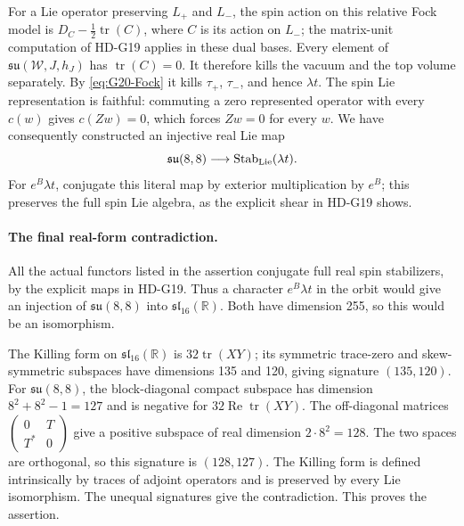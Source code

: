 For a Lie operator preserving \(L_+\) and \(L_-\), the spin
action on this relative Fock model is
\(D_C-\tfrac12\operatorname{tr}(C)\), where
\(C\) is its action on \(L_-\); the matrix-unit computation of
HD-G19 applies in these dual bases. Every element of
\(\mathfrak{su}(\mathcal W,J,h_J)\) has \(\operatorname{tr}(C)=0\).
It therefore kills the vacuum and the top volume separately. By
\eqref{eq:G20-Fock} it kills \(\tau_+\), \(\tau_-\), and hence
\(\lambda t\). The spin Lie representation is faithful: commuting
a zero represented operator with every \(c(w)\) gives \(c(Zw)=0\),
which forces \(Zw=0\) for every \(w\). We have consequently
constructed an injective real Lie map
\begin{equation}\label{eq:G20-target-stabilizer}
       \mathfrak{su}(8,8)\longrightarrow\operatorname{Stab}_{\rm Lie}
                                            (\lambda t).
\end{equation}
For \(e^B\lambda t\), conjugate this literal map by exterior
multiplication by \(e^B\); this preserves the full spin Lie algebra,
as the explicit shear in HD-G19 shows.

\paragraph{The final real-form contradiction.}
All the actual functors listed in the assertion conjugate full real
spin stabilizers, by the explicit maps in HD-G19. Thus a character
\(e^B\lambda t\) in the orbit would give an injection of
\(\mathfrak{su}(8,8)\) into
\(\mathfrak{sl}_{16}(\mathbb R)\). Both have dimension 255, so
this would be an isomorphism.

The Killing form on \(\mathfrak{sl}_{16}(\mathbb R)\) is
\(32\operatorname{tr}(XY)\); its symmetric trace-zero and
skew-symmetric subspaces have dimensions 135 and 120, giving signature
\((135,120)\). For \(\mathfrak{su}(8,8)\), the block-diagonal
compact subspace has dimension \(8^2+8^2-1=127\) and is negative
for \(32\operatorname{Re}\operatorname{tr}(XY)\). The off-diagonal
matrices \(\left(\begin{smallmatrix}0&T\\T^*&0\end{smallmatrix}\right)\)
give a positive subspace of real dimension \(2\cdot8^2=128\).
The two spaces are orthogonal, so this signature is \((128,127)\).
The Killing form is defined intrinsically by traces of adjoint
operators and is preserved by every Lie isomorphism. The unequal
signatures give the contradiction. This proves the assertion.

